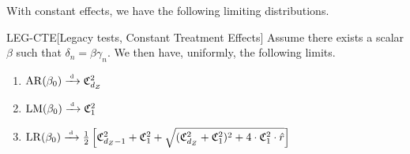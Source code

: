 \noindent
With constant effects, we have the following limiting distributions.
\begin{lemmap}{LEG-CTE}[Legacy tests, Constant Treatment Effects] Assume there exists a scalar \(\beta\) such that \(\delta_n=\beta \gamma_n\). We then have, uniformly, the following limits.
    \begin{enumerate}
        \item 
        \(\mathrm{AR}(\beta_0)\xrightarrow{{\scriptscriptstyle \mathrm{\;d\;}}} \mathfrak{C}^2_{d_Z}\)
        \item 
        \(\mathrm{LM}(\beta_0)\xrightarrow{{\scriptscriptstyle \mathrm{\;d\;}}} \mathfrak{C}^2_1\)
        \item 
        \(\mathrm{LR}(\beta_0)\xrightarrow{{\scriptscriptstyle \mathrm{\;d\;}}} \frac{1}{2}\left[\mathfrak{C}^2_{d_Z-1}+\mathfrak{C}^2_1 + \sqrt{(\mathfrak{C}^2_{d_Z}+\mathfrak{C}^2_1)^2 + 4 \cdot \mathfrak{C}^2_1 \cdot \hat r} \right]\) 
    \end{enumerate}
\end{lemmap}
